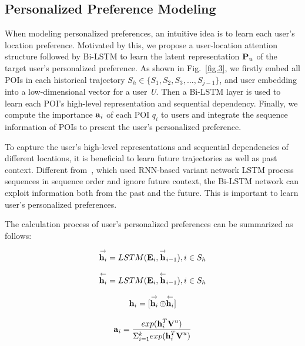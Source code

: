\documentclass[10pt,journal,compsoc]{IEEEtran}
\begin{document}
\subsection{Personalized Preference Modeling}
When modeling personalized preferences, an intuitive idea is to learn each user’s location preference. Motivated by this, we propose a user-location attention structure followed by Bi-LSTM to learn the latent representation $\bm{{\rm P}}_u$ of the target user’s personalized preference. As shown in Fig.~\ref{fig.3}, we firstly embed all POIs in each historical trajectory $S_h\in\{S_1,S_2,S_3,...,S_{j-1}\}$, and user embedding into a low-dimensional vector for a user \textit{U}. Then a Bi-LSTM layer is used to learn each POI’s high-level representation and sequential dependency. Finally, we compute the importance $\bm{{\rm a}}_i$ of each POI $q_i$ to users and integrate the sequence information of POIs to present the user’s personalized preference.

To capture the user’s high-level representations and sequential dependencies of different locations, it is beneficial to learn future trajectories as well as past context. Different from~\cite{feng2018deepmove}, which used RNN-based variant network LSTM process sequences in sequence order and ignore future context, the Bi-LSTM network can exploit information both from the past and the future. This is important to learn user’s personalized preferences.

The calculation process of user's personalized preferences can be summarized as follows:

\begin{equation}%
    \mathop{\bm{{\rm h}}_i}\limits ^{\rightarrow} = LSTM(\bm{{\rm E}}_i,{\mathop{\bm{{\rm h}}}\limits ^{\rightarrow}}_{i-1}),i\in{S_h}
\end{equation}

\begin{equation}%
    \mathop{\bm{{\rm h}}_i}\limits ^{\leftarrow} = LSTM(\bm{{\rm E}}_i,{\mathop{\bm{{\rm h}}}\limits ^{\leftarrow}}_{i-1}),i\in{S_h}
\end{equation}

\begin{equation}
    \bm{{\rm h}}_i= [\mathop{\bm{{\rm h}}_i}\limits ^{\rightarrow} \oplus{\mathop{\bm{{\rm h}}_i}\limits ^{\leftarrow}} ]
\end{equation}

\begin{equation}
    \bm{{\rm a}}_i = \frac{exp(\bm{{\rm h}}_{i}^T \bm{{\rm V}}^u)}{\Sigma^{k}_{i=1}{exp(\bm{{\rm h}}_{i}^T \bm{{\rm V}}^u)}}
\end{equation}
\end{document}
